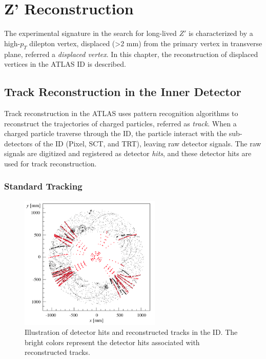 \chapter{Z' Reconstruction}
\label{chap:reco}

The experimental signature in the search for long-lived $Z'$ is characterized by a high-$p_{T}$ dilepton vertex, displaced (>2 \si{\milli\meter}) from the primary vertex in transverse plane, referred a \textit{displaced vertex}. In this chapter, the reconstruction of displaced vertices in the ATLAS ID is described.

\section{Track Reconstruction in the Inner Detector}
\label{sec:reco:track}

Track reconstruction in the ATLAS uses pattern recognition algorithms to reconstruct the trajectories of charged particles, referred as \textit{track}. When a charged particle traverse through the ID, the particle interact with the sub-detectors of the ID (Pixel, SCT, and TRT), leaving raw detector signals. The raw signals are digitized and registered as detector \textit{hits}, and these detector hits are used for track reconstruction. 

\subsection{Standard Tracking}
\label{sec:reco:st}


\begin{figure}[!htb]
    \includegraphics[width=0.6\textwidth]{figures/tracking.png}
    \centering
    \caption{Illustration of detector hits and reconstructed tracks in the ID. The bright colors represent the detector hits associated with reconstructed tracks.}
    \label{fig:tracking}
\end{figure}

